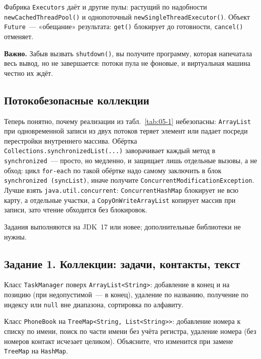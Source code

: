 Фабрика \texttt{Executors} даёт и другие пулы: растущий по надобности
\texttt{newCachedThreadPool()} и однопоточный
\texttt{newSingleThreadExecutor()}. Объект \texttt{Future}~--- «обещание»
результата: \texttt{get()} блокирует до готовности, \texttt{cancel()} отменяет.

\begin{vrezka}
\textbf{Важно.} Забыв вызвать \texttt{shutdown()}, вы получите программу, которая
напечатала весь вывод, но не завершается: потоки пула не фоновые, и виртуальная
машина честно их ждёт.
\end{vrezka}

\subsection{Потокобезопасные коллекции}

Теперь понятно, почему реализации из табл.~\ref{tab:05-1} небезопасны:
\texttt{ArrayList} при одновременной записи из двух потоков теряет элемент или
падает посреди перестройки внутреннего массива. Обёртка
\texttt{Collections.synchronizedList(...)} заворачивает каждый метод в
\texttt{synchronized}~--- просто, но медленно, и защищает лишь отдельные вызовы,
а не обход: цикл \texttt{for-each} по такой обёртке надо самому заключить в блок
\texttt{synchronized (syncList)}, иначе получите
\texttt{ConcurrentModificationException}. Лучше взять
\texttt{java.util.concurrent}: \texttt{ConcurrentHashMap} блокирует не всю карту,
а отдельные участки, а \texttt{CopyOnWriteArrayList} копирует массив при записи,
зато чтение обходится без блокировок.

\praktikum{}

Задания выполняются на JDK~17 или новее; дополнительные библиотеки не нужны.

\subsection*{Задание 1. Коллекции: задачи, контакты, текст}

Класс \texttt{TaskManager} поверх \texttt{ArrayList<String>}: добавление в конец
и на позицию (при недопустимой~--- в конец), удаление по названию, получение по
индексу или \texttt{null} вне диапазона, сортировка по алфавиту.

Класс \texttt{PhoneBook} на \texttt{TreeMap<String, List<String>>}: добавление
номера к списку по имени, поиск по части имени без учёта регистра, удаление
номера (без номеров контакт исчезает целиком). Объясните, что изменится при
замене \texttt{TreeMap} на \texttt{HashMap}.

